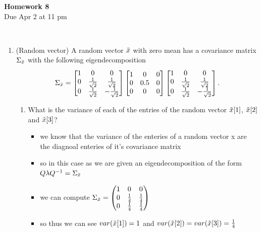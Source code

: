 \documentclass[12pt,twoside]{article}
\begin{document}
\begin{center}
{\large{\textbf{Homework 8}} } \vspace{0.2cm}\\
Due Apr 2 at 11 pm
\\
\end{center}
\\

\begin{enumerate}

\item (Random vector) 
A random vector $\tilde{  x }$ with zero mean has a covariance matrix $\Sigma_{\tilde{  x }}$ with the following eigendecomposition
\begin{align}
\Sigma_{\tilde{  x }} = \begin{bmatrix} 1 & 0 & 0 \\ 0 & \frac{1}{\sqrt{2}} & \frac{1}{\sqrt{2}} \\ 0 & \frac{1}{\sqrt{2}} & -\frac{1}{\sqrt{2}} \end{bmatrix} \begin{bmatrix} 1 & 0 & 0 \\ 0 & 0.5 & 0 \\ 0 & 0 & 0 \end{bmatrix} \begin{bmatrix} 1 & 0 & 0 \\ 0 & \frac{1}{\sqrt{2}} & \frac{1}{\sqrt{2}} \\ 0 & \frac{1}{\sqrt{2}} & -\frac{1}{\sqrt{2}} \end{bmatrix}.
\end{align}
\begin{enumerate}
\item What is the variance of each of the entries of the random vector $\tilde{  x }[1]$, $\tilde{  x }[2]$ and $\tilde{  x }[3]$?
\begin{itemize}
  \color{blue}
  \item we know that the variance of the enteries of a random vector x are the diagnoal enteries of it's covariance matrix 
  \item so in this case as we are given an eigendecomposition of the form $Q\lambda Q^{-1}=\Sigma_{\Tilde{x}}$
  \item we can compute $\Sigma_{\Tilde{x}}=\begin{pmatrix}
    1 & 0 &0\\
    0 & \frac{1}{4} & \frac{1}{4}\\
    0 & \frac{1}{4} & \frac{1}{4}\\
  \end{pmatrix}$
  \item so thus we can see $var(\Tilde{x}[1])=1$ and $var(\Tilde{x}[2])=var(\Tilde{x}[3])=\frac{1}{4}$
\end{itemize}


\end{enumerate}
\end{enumerate}
\end{document}

